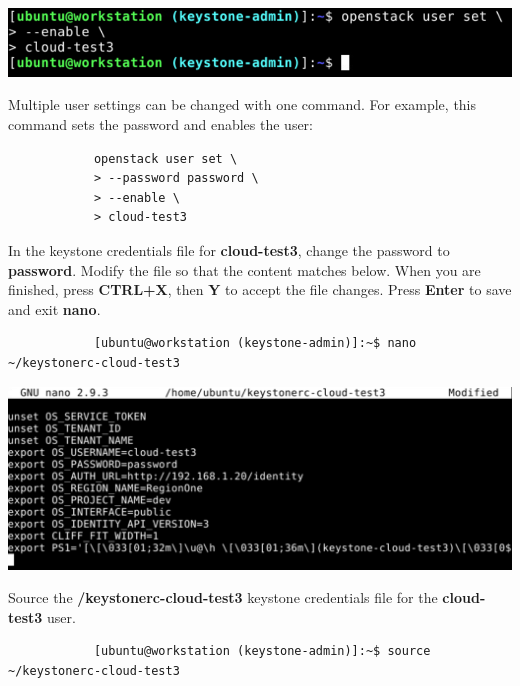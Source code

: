 \documentclass[letterpaper, 12pt]{article}
\begin{document}
\begin{enumerate}
\begin{labstep}
        \begin{center}
            \includegraphics[width=\linewidth]{images/part4/step16.png}
        \end{center}
    \end{labstep}

    \begin{tipbox}
        Multiple user settings can be changed with one command.
        For example, this command sets the password and enables the user:
        \begin{lstlisting}
            openstack user set \
            > --password password \
            > --enable \
            > cloud-test3
        \end{lstlisting}
    \end{tipbox}

    \begin{labstep}
        In the keystone credentials file for \textbf{cloud-test3}, change the password to \textbf{password}.
        Modify the file so that the content matches below.
        When you are finished, press \textbf{CTRL+X}, then \textbf{Y} to accept the file changes.
        Press \textbf{Enter} to save and exit \textbf{nano}.
        \begin{lstlisting}
            [ubuntu@workstation (keystone-admin)]:~$ nano ~/keystonerc-cloud-test3
        \end{lstlisting}

        \begin{center}
            \includegraphics[width=\linewidth]{images/part4/step17.png}
        \end{center}
    \end{labstep}

    \begin{labstep}
        Source the \textbf{\texttildemid/keystonerc-cloud-test3} keystone credentials file for the
        \textbf{cloud-test3} user.
        \begin{lstlisting}
            [ubuntu@workstation (keystone-admin)]:~$ source ~/keystonerc-cloud-test3
        \end{lstlisting}


\end{labstep}
\end{enumerate}
\end{document}
